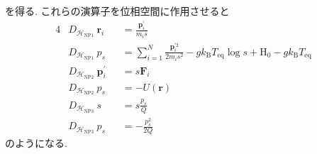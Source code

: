 を得る.
これらの演算子を位相空間に作用させると
\begin{alignat}{4}
  &D_{\mathcal{H}_{\mathrm{NP1}}} ~ \bm{r}_{i}
  &&=
  \frac{\bm{p}_{i}^{\prime}}{m_{i}s}
  \label{Eq:Liouville-NP1-r} \\
  &D_{\mathcal{H}_{\mathrm{NP1}}} ~ p_{s}
  &&=
  \sum_{i=1}^{N}
  \frac{\bm{p}_{i}^{\prime 2}}{2m_{i}s^{2}}
  -
  g k_{\mathrm{B}} T_{\mathrm{eq}} \log s
  +
  \mathrm{H}_{0}
  -
  g k_{\mathrm{B}} T_{\mathrm{eq}}
  \label{Eq:Liouville-NP1-s} \\
  &D_{\mathcal{H}_{\mathrm{NP2}}} ~ \bm{p}_{i}^{\prime}
  &&=
  s \bm{F}_{i}
  \label{Eq:Liouville-NP2-p} \\
  &D_{\mathcal{H}_{\mathrm{NP2}}} ~ p_{s}
  &&=
  -U(\bm{r})
  \label{Eq:Liouville-NP2-Ps} \\
  &D_{\mathcal{H}_{\mathrm{NP3}}} ~ s
  &&=
  s \frac{p_{s}}{Q}
  \label{Eq:Liouville-NP3-s} \\
  &D_{\mathcal{H}_{\mathrm{NP3}}} ~ p_{s}
  &&=
  -\frac{p_{s}^{2}}{2Q}
  \label{Eq:Liouville-NP3P-s}
\end{alignat}
のようになる.

